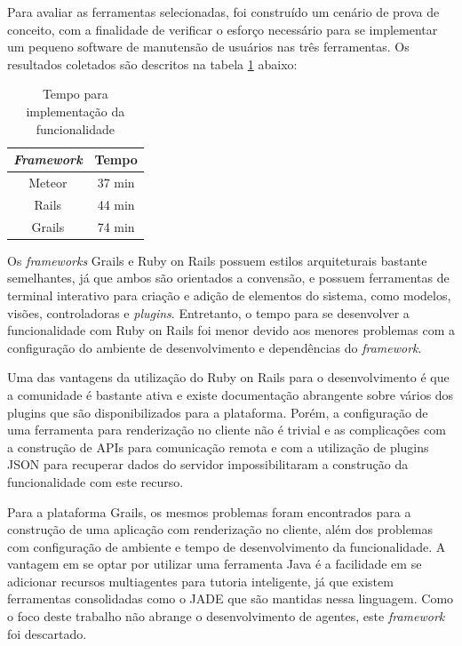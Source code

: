 Para avaliar as ferramentas selecionadas, foi construído um cenário de prova de conceito, com a finalidade de verificar o esforço necessário para se implementar um pequeno software de manutensão de usuários nas três ferramentas. Os resultados coletados são descritos na tabela \ref{tab:tempo} abaixo:

\begin{table}[h!]
	\centering
	\begin{tabular}{| c | c |}
		\hline
		\textit{Framework} & Tempo \\
		\hline
		Meteor & 37 min \\
		\hline
		Rails & 44 min \\
		\hline
		Grails & 74 min \\
		\hline
	\end{tabular}
	\caption{Tempo para implementação da funcionalidade}
	\label{tab:tempo}
\end{table}

Os \textit{frameworks} Grails e Ruby on Rails possuem estilos arquiteturais bastante semelhantes, já que ambos são orientados a convensão, e possuem ferramentas de terminal interativo para criação e adição de elementos do sistema, como modelos, visões, controladoras e \textit{plugins}. Entretanto, o tempo para se desenvolver a funcionalidade com Ruby on Rails foi menor devido aos menores problemas com a configuração do ambiente de desenvolvimento e dependências do \textit{framework}.

Uma das vantagens da utilização do Ruby on Rails para o desenvolvimento é que a comunidade é bastante ativa e existe documentação abrangente sobre vários dos plugins que são disponibilizados para a plataforma. Porém, a configuração de uma ferramenta para renderização no cliente não é trivial e as complicações com a construção de APIs para comunicação remota e com a utilização de plugins JSON para recuperar dados do servidor impossibilitaram a construção da funcionalidade com este recurso.

Para a plataforma Grails, os mesmos problemas foram encontrados para a construção de uma aplicação com renderização no cliente, além dos problemas com configuração de ambiente e tempo de desenvolvimento da funcionalidade. A vantagem em se optar por utilizar uma ferramenta Java é a facilidade em se adicionar recursos multiagentes para tutoria inteligente, já que existem ferramentas consolidadas como o JADE \cite{jade2015} que são mantidas nessa linguagem. Como o foco deste trabalho não abrange o desenvolvimento de agentes, este \textit{framework} foi descartado.

